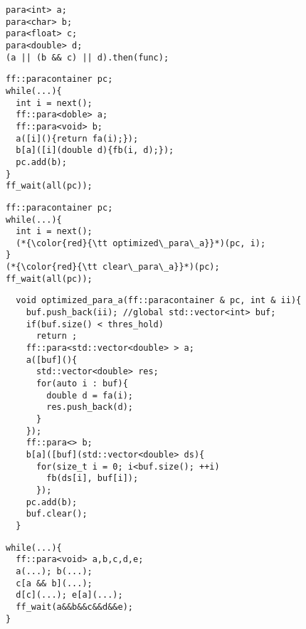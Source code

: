 
\newsavebox{\thenlisting}
\begin{lrbox}{\thenlisting}%
\begin{lstlisting}
para<int> a;
para<char> b;
para<float> c;
para<double> d;
(a || (b && c) || d).then(func);
\end{lstlisting}
\end{lrbox}


\newsavebox{\samplelisting}
\begin{lrbox}{\samplelisting}
\begin{lstlisting}
ff::paracontainer pc;
while(...){
  int i = next();
  ff::para<doble> a;
  ff::para<void> b;
  a([i](){return fa(i);});
  b[a]([i](double d){fb(i, d);});
  pc.add(b);
}
ff_wait(all(pc));
\end{lstlisting}
\end{lrbox}

\newsavebox{\osamplelisting}
\begin{lrbox}{\osamplelisting}
\begin{lstlisting}
ff::paracontainer pc;
while(...){
  int i = next();
  (*{\color{red}{\tt optimized\_para\_a}}*)(pc, i);
}
(*{\color{red}{\tt clear\_para\_a}}*)(pc);
ff_wait(all(pc));
\end{lstlisting}
\end{lrbox}

\newsavebox{\optfunclisting}
\begin{lrbox}{\optfunclisting}
\begin{lstlisting}
  void optimized_para_a(ff::paracontainer & pc, int & ii){
    buf.push_back(ii); //global std::vector<int> buf;
    if(buf.size() < thres_hold)
      return ;
    ff::para<std::vector<double> > a;
    a([buf](){
      std::vector<double> res;
      for(auto i : buf){
        double d = fa(i);
        res.push_back(d);
      }
    });
    ff::para<> b;
    b[a]([buf](std::vector<double> ds){
      for(size_t i = 0; i<buf.size(); ++i)
        fb(ds[i], buf[i]);
      });
    pc.add(b);
    buf.clear();
  }
\end{lstlisting}
\end{lrbox}

\newsavebox{\depexample}
\begin{lrbox}{\depexample}
\begin{lstlisting}[mathescape]
while(...){
  ff::para<void> a,b,c,d,e;
  a(...); b(...);
  c[a && b](...);
  d[c](...); e[a](...);
  ff_wait(a&&b&&c&&d&&e);
}
\end{lstlisting}
\end{lrbox}

